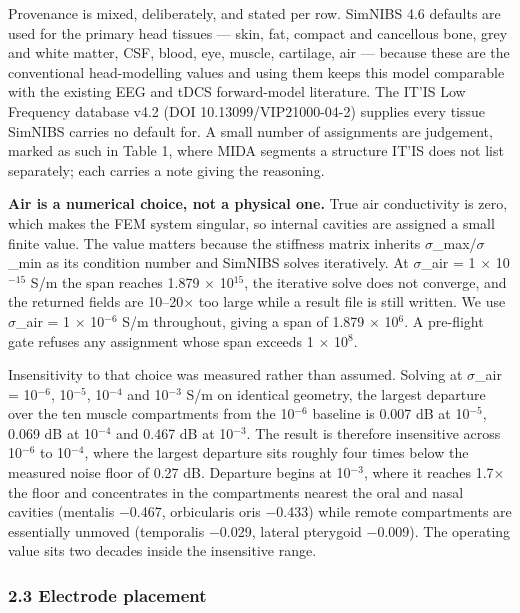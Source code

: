 \documentclass[
  11pt,
]{article}
\begin{document}
Provenance is mixed, deliberately, and stated per row. SimNIBS 4.6 defaults are
used for the primary head tissues --- skin, fat, compact and cancellous bone, grey
and white matter, CSF, blood, eye, muscle, cartilage, air --- because these are
the conventional head-modelling values and using them keeps this model
comparable with the existing EEG and tDCS forward-model literature. The IT'IS
Low Frequency database v4.2 (DOI 10.13099/VIP21000-04-2) supplies every tissue
SimNIBS carries no default for. A small number of assignments are judgement,
marked as such in Table 1, where MIDA segments a structure IT'IS does not list
separately; each carries a note giving the reasoning.

\textbf{Air is a numerical choice, not a physical one.} True air conductivity is
zero, which makes the FEM system singular, so internal cavities are assigned a
small finite value. The value matters because the stiffness matrix inherits
\(\sigma\)\_max/\(\sigma\)\_min as its condition number and SimNIBS solves iteratively. At
\(\sigma\)\_air = 1 \(\times\) 10\(^{-15}\) S/m the span reaches 1.879 \(\times\) 10\(^{15}\), the iterative solve does
not converge, and the returned fields are 10--20\(\times\) too large while a result file
is still written. We use \(\sigma\)\_air = 1 \(\times\) 10\(^{-6}\) S/m throughout, giving a span of
1.879 \(\times\) 10\(^{6}\). A pre-flight gate refuses any assignment whose span exceeds
1 \(\times\) 10\(^{8}\).

Insensitivity to that choice was measured rather than assumed. Solving at
\(\sigma\)\_air = 10\(^{-6}\), 10\(^{-5}\), 10\(^{-4}\) and 10\(^{-3}\) S/m on identical geometry, the largest
departure over the ten muscle compartments from the 10\(^{-6}\) baseline is 0.007 dB at
10\(^{-5}\), 0.069 dB at 10\(^{-4}\) and 0.467 dB at 10\(^{-3}\). The result is therefore
insensitive across 10\(^{-6}\) to 10\(^{-4}\), where the largest departure sits roughly four
times below the measured noise floor of 0.27 dB. Departure begins at 10\(^{-3}\), where
it reaches 1.7\(\times\) the floor and concentrates in the compartments nearest the oral
and nasal cavities (mentalis −0.467, orbicularis oris −0.433) while remote
compartments are essentially unmoved (temporalis −0.029, lateral pterygoid
−0.009). The operating value sits two decades inside the insensitive range.

\subsubsection{2.3 Electrode placement}\label{electrode-placement}
\end{document}
